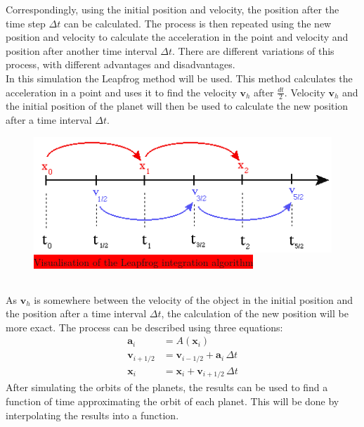 \documentclass[reprint,english,notitlepage]{revtex4-2}
\begin{document}
Correspondingly, using the initial position and velocity, the position after the time step $\Delta t$ can be calculated.
The process is then repeated using the new position and velocity to calculate the acceleration in the point and velocity and position after another time interval $\Delta t$.
There are different variations of this process, with different advantages and disadvantages.\\
In this simulation the Leapfrog method will be used.
This method calculates the acceleration in a point and uses it to find the velocity $\textbf{v}_h$ after $ \frac{dt}{2}$.
Velocity $\textbf{v}_h$ and the initial position of the planet will then be used to calculate the new position after a time interval $\Delta t$.\\
\begin{figure}[h]
	\centering
	\includegraphics[scale=0.4]{Figures/leapfrog1}
	\caption{\colorbox{red}{Visualisation of the Leapfrog integration algorithm}}\label{fig:Leapfrog_vis}
\end{figure}\\
As $\textbf{v}_h$ is somewhere between the velocity of the object in the initial position and the position after a time interval $\Delta t$, the calculation of the new position will be more exact.
The process can be described using three equations:
\begin{align*}
    \textbf{a}_i &= A(\textbf{x}_i)\\
	\textbf{v}_{i+1/2} &= \textbf{v}_{i-1/2} + \textbf{a}_i\,\Delta t\\
	\textbf{x}_{i} &= \textbf{x}_i + \textbf{v}_{i+1/2}\,\Delta t
\end{align*}
After simulating the orbits of the planets, the results can be used to find a function of time approximating the orbit of each planet.
This will be done by interpolating the results into a function.\\\\
\end{document}
